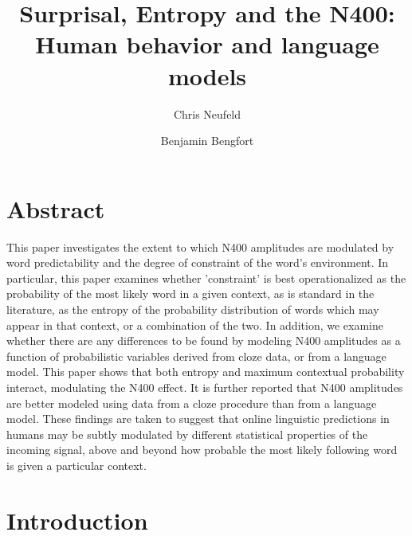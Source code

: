 \documentclass{article}
\begin{document}
\title{Surprisal, Entropy and the N400: \\
Human behavior and language models}

\author[1]{Chris Neufeld}
\author[2]{Benjamin Bengfort}

\maketitle

\section*{Abstract}

This paper investigates the extent to which N400 amplitudes are modulated by word predictability and the degree of constraint of the word's environment. In particular, this paper examines whether 'constraint' is best operationalized as the probability of the most likely word in a given context, as is standard in the literature, as the entropy of the probability distribution of words which may appear in that context, or a combination of the two. In addition, we examine whether there are any differences to be found by modeling N400 amplitudes as a function of probabilistic variables derived from cloze data, or from a language model. This paper shows that both entropy and maximum contextual probability interact, modulating the N400 effect. It is further reported that N400 amplitudes are better modeled using data from a cloze procedure than from a language model. These findings are taken to suggest that online linguistic predictions in humans may be subtly modulated by different statistical properties of the incoming signal, above and beyond how probable the most likely following word is given a particular context.


\section{Introduction}
\end{document}
